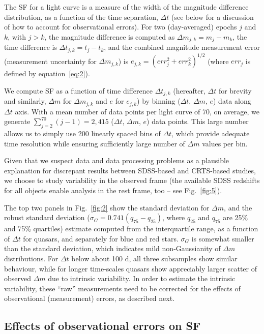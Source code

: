 \documentclass[fleqn,usenatbib]{mnras}
\begin{document}
The SF for a light curve is a measure of the width of the magnitude difference distribution, as a function of the time separation, $\Delta t$ (see below for a discussion of how to account for observational errors). For two (day-averaged) epochs $j$ and $k$,  with $j > k$, the magnitude difference is computed as $\Delta m_{j,k} = m_{j} - m_{k}$, the time difference is  $\Delta t_{j,k} = t_{j} - t_{k}$, and  the combined magnitude measurement error (measurement uncertainty for $\Delta m_{j,k}$) is $e_{j,k} = (err_{j}^{2} + err_{k}^{2})^{1/2}$ (where $err_{j}$ is defined by equation~\ref{eq:2}). 

We compute SF as a function of time difference $\Delta t_{j,k}$ (hereafter, $\Delta t$ for brevity and similarly, $\Delta m$ for $\Delta m_{j,k}$ and $e$ for $e_{j,k}$) by binning ($\Delta t$, $\Delta m$, $e$) data along $\Delta t$ axis.  With a mean number of data points per light curve of  70, on average, we generate $\sum_{j=2}^{70}{(j-1)} = 2,415$  ($\Delta t$, $\Delta m$, $e$) data points. This large number allows us  to simply use 200 linearly spaced bins of $\Delta t$, which provide adequate time resolution while ensuring sufficiently large number of  $\Delta m$ values per bin.

Given that we suspect data and data processing problems as a plausible explanation for discrepant
results between SDSS-based and CRTS-based studies, we choose to study variability in the observed frame (the available SDSS
redshifts for all objects enable analysis in the rest frame, too -- see Fig.~\ref{fig:5}). 

The top two panels in Fig.~\ref{fig:2} show the standard deviation for $\Delta m$, and the robust standard 
deviation ($\sigma_G=0.741 (q_{75} - q_{25})$, where $q_{25}$ and $q_{75}$ are 25\% and 75\% quartiles) 
estimate computed from the interquartile range, as a function of $\Delta t$ for quasars, and 
separately for blue and red stars. $\sigma_G$ is somewhat smaller than the standard deviation, which indicates mild 
non-Gaussianity of $\Delta m$ distributions. For $\Delta t$ below about 100 d, all three subsamples 
show similar behaviour, while for longer time-scales quasars show appreciably larger scatter of observed 
$\Delta m$ due to intrinsic variability. In order to estimate the intrinsic variability, these ``raw'' 
measurements need to be corrected for the effects of observational (measurement) errors, as described next.



\subsection{Effects of observational errors on SF}
\end{document}
